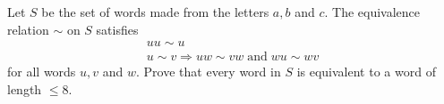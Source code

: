 Let \(S\) be the set of words made from the letters \(a,b\) and \(c\). The equivalence relation \(\sim\) on \(S\) satisfies
\begin{gather*}
uu \sim u \\
u \sim v \Rightarrow uw \sim vw \; \text{and} \; wu \sim wv
\end{gather*}
for all words \(u, v\) and \(w\). Prove that every word in \(S\) is equivalent to a word of length \(\leq 8\).